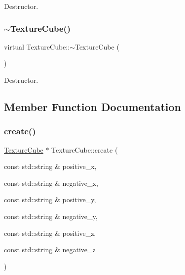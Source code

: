 Destructor. \mbox{\label{classTextureCube_a2811823e739aaa171649ee1de3dda98f}} 
\subsubsection{\texorpdfstring{$\sim$\+Texture\+Cube()}{~TextureCube()}\hspace{0.1cm}{\footnotesize\ttfamily [2/2]}}
{\footnotesize\ttfamily virtual Texture\+Cube\+::$\sim$\+Texture\+Cube (\begin{DoxyParamCaption}{ }\end{DoxyParamCaption})\hspace{0.3cm}{\ttfamily [virtual]}}

Destructor. 

\subsection{Member Function Documentation}
\mbox{\label{classTextureCube_a469adda77a9a06251e5c426f85ff75b9}} 
\subsubsection{\texorpdfstring{create()}{create()}\hspace{0.1cm}{\footnotesize\ttfamily [1/2]}}
{\footnotesize\ttfamily \hyperlink{classTextureCube}{Texture\+Cube} $\ast$ Texture\+Cube\+::create (\begin{DoxyParamCaption}\item[{const std\+::string \&}]{positive\+\_\+x,  }\item[{const std\+::string \&}]{negative\+\_\+x,  }\item[{const std\+::string \&}]{positive\+\_\+y,  }\item[{const std\+::string \&}]{negative\+\_\+y,  }\item[{const std\+::string \&}]{positive\+\_\+z,  }\item[{const std\+::string \&}]{negative\+\_\+z }\end{DoxyParamCaption})\hspace{0.3cm}{\ttfamily [static]}}

